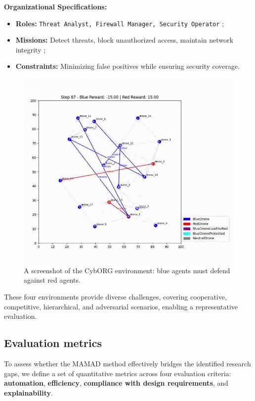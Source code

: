 \documentclass[pdflatex,sn-mathphys-num]{sn-jnl}%
\theoremstyle{thmstyleone}%
\theoremstyle{thmstyletwo}%
\theoremstyle{thmstylethree}%
\begin{document}
\textbf{Organizational Specifications:}
\begin{itemize}
    \item \textbf{Roles:} \texttt{Threat Analyst, Firewall Manager, Security Operator} ;
    \item \textbf{Missions:} Detect threats, block unauthorized access, maintain network integrity ;
    \item \textbf{Constraints:} Minimizing false positives while ensuring security coverage.
\end{itemize}

\begin{figure}[h!]
    \centering
    \includegraphics[width=0.7\linewidth]{figures/cyborg.png}
    \caption{A screenshot of the CybORG environment: blue agents must defend against red agents.}
    \label{fig:cyborg}
\end{figure}

\bigskip

\noindent These four environments provide diverse challenges, covering cooperative, competitive, hierarchical, and adversarial scenarios, enabling a representative evaluation.


\subsection{Evaluation metrics}

To assess whether the MAMAD method effectively bridges the identified research gaps, we define a set of quantitative metrics across four evaluation criteria: \textbf{automation}, \textbf{efficiency}, \textbf{compliance with design requirements}, and \textbf{explainability}.
\end{document}
